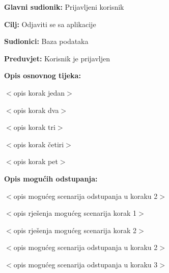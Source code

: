 \noindent {}
\begin{packed_item}

\item \textbf{Glavni sudionik:} Prijavljeni korisnik
\item  \textbf{Cilj:} Odjaviti se sa aplikacije
\item  \textbf{Sudionici:} Baza podataka
\item  \textbf{Preduvjet:} Korisnik je prijavljen
\item  \textbf{Opis osnovnog tijeka:}

\item[] \begin{packed_enum}

    \item $<$opis korak jedan$>$
    \item $<$opis korak dva$>$
    \item $<$opis korak tri$>$
    \item $<$opis korak četiri$>$
    \item $<$opis korak pet$>$

\end{packed_enum}

\item  \textbf{Opis mogućih odstupanja:}

\item[] \begin{packed_item}

    \item[2.a] $<$opis mogućeg scenarija odstupanja u koraku 2$>$

    \item[] \begin{packed_enum}

        \item $<$opis rješenja mogućeg scenarija korak 1$>$
        \item $<$opis rješenja mogućeg scenarija korak 2$>$

    \end{packed_enum}

\item[2.b] $<$opis mogućeg scenarija odstupanja u koraku 2$>$
\item[3.a] $<$opis mogućeg scenarija odstupanja  u koraku 3$>$

\end{packed_item}

\end{packed_item}

